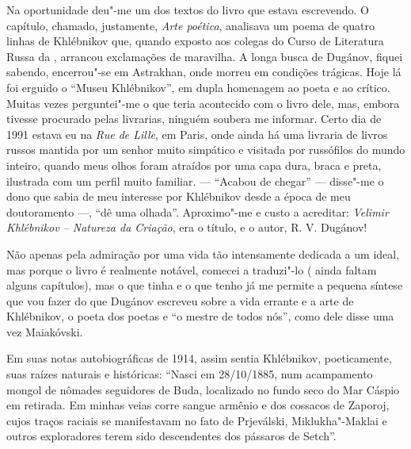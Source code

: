 Na oportunidade deu"-me um dos textos do livro que estava escrevendo. O
capítulo, chamado, justamente, \emph{Arte poética}, analisava um poema
de quatro linhas de Khlébnikov que, quando exposto aos colegas do Curso
de Literatura Russa da , arrancou exclamações de maravilha. A longa
busca de Dugánov, fiquei sabendo, encerrou"-se em Astrakhan, onde
morreu em condições trágicas. Hoje lá foi erguido o ``Museu
Khlébnikov'', em dupla homenagem ao poeta e ao crítico. Muitas vezes
perguntei"-me o que teria acontecido com o livro dele, mas, embora
tivesse procurado pelas livrarias, ninguém soubera me informar. Certo
dia de 1991 estava eu na \emph{Rue de Lille}, em Paris, onde ainda há
uma livraria de livros russos mantida por um senhor muito simpático e
visitada por russófilos do mundo inteiro, quando meus olhos foram
atraídos por uma capa dura, braca e preta, ilustrada com um perfil muito
familiar. --- ``Acabou de chegar'' --- disse"-me o dono que sabia de meu
interesse por Khlébnikov desde a época de meu doutoramento ---, ``dê uma
olhada''. Aproximo"-me e custo a acreditar: \emph{Velimir Khlébnikov -- Natureza da Criação}, era o título, e o autor, R. V.
Dugánov!

Não apenas pela admiração por uma vida tão intensamente dedicada a um
ideal, mas porque o livro é realmente notável, comecei a traduzi"-lo (
ainda faltam alguns capítulos), mas o que tinha e o que tenho já me
permite a pequena síntese que vou fazer do que Dugánov escreveu sobre a
vida errante e a arte de Khlébnikov, o poeta dos poetas e ``o mestre de
todos nós'', como dele disse uma vez Maiakóvski.

Em suas notas autobiográficas de 1914, assim sentia Khlébnikov,
poeticamente, suas raízes naturais e históricas: ``Nasci em 28/10/1885,
num acampamento mongol de nômades seguidores de Buda, localizado no
fundo seco do Mar Cáspio em retirada. Em minhas veias corre sangue
armênio e dos cossacos de Zaporoj, cujos traços raciais se manifestavam
no fato de Prjeválski, Miklukha"-Maklai e outros exploradores terem sido
descendentes dos pássaros de Setch''.

